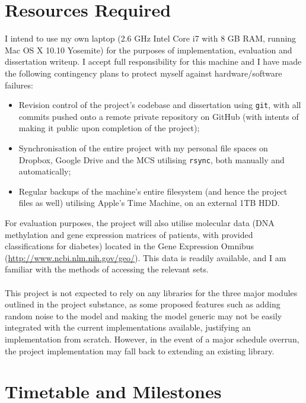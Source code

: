 \section*{Resources Required}

I intend to use my own laptop (2.6 GHz Intel Core i7 with 8 GB RAM, running Mac OS X 10.10 Yosemite) for the purposes of implementation, evaluation and dissertation writeup. I accept full responsibility for this machine and I have made the following contingency plans to protect myself against hardware/software failures:

\begin{itemize}
    \item Revision control of the project's codebase and dissertation using \texttt{git}, with all commits pushed onto a remote private repository on GitHub (with intents of making it public upon completion of the project);
    \item Synchronisation of the entire project with my personal file spaces on Dropbox, Google Drive and the MCS utilising \texttt{rsync}, both manually and automatically;
    \item Regular backups of the machine's entire filesystem (and hence the project files as well) utilising Apple's Time Machine, on an external 1TB HDD.
\end{itemize}
For evaluation purposes, the project will also utilise molecular data (DNA methylation and gene expression matrices of patients, with provided classifications for diabetes) located in the Gene Expression Omnibus (\url{http://www.ncbi.nlm.nih.gov/geo/}). This data is readily available, and I am familiar with the methods of accessing the relevant sets. \\ \\
This project is not expected to rely on any libraries for the three major modules outlined in the project substance, as some proposed features such as adding random noise to the model and making the model generic may not be easily integrated with the current implementations available, justifying an implementation from scratch. However, in the event of a major schedule overrun, the project implementation may fall back to extending an existing library.

\section*{Timetable and Milestones}

